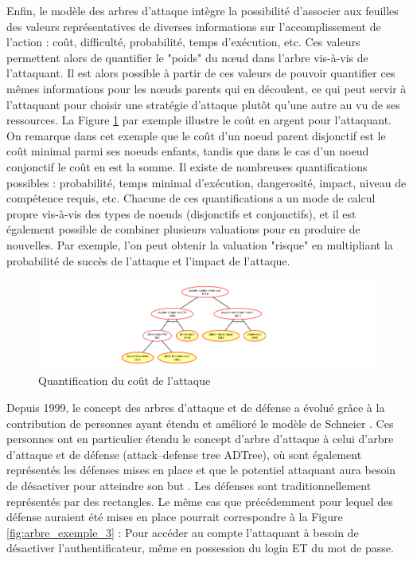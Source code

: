         Enfin, le modèle des arbres d'attaque intègre la possibilité d'associer aux feuilles des valeurs représentatives de diverses informations sur l'accomplissement de l'action : coût, difficulté, probabilité, temps d'exécution, etc. Ces valeurs permettent alors de quantifier le "poids" du nœud dans l'arbre vis-à-vis de l'attaquant. Il est alors possible à partir de ces valeurs de pouvoir quantifier ces mêmes informations pour les nœuds parents qui en découlent, ce qui peut servir à l'attaquant pour choisir une stratégie d'attaque plutôt qu'une autre au vu de ses ressources. La Figure \ref{fig:arbre_exemple_2} par exemple illustre le coût en argent pour l'attaquant. On remarque dans cet exemple que le coût d'un noeud parent disjonctif est le coût minimal parmi ses noeuds enfants, tandis que dans le cas d'un noeud conjonctif le coût en est la somme. Il existe de nombreuses quantifications possibles : probabilité, temps minimal d'exécution, dangerosité, impact, niveau de compétence requis, etc. Chacune de ces quantifications a un mode de calcul propre vis-à-vis des types de noeuds (disjonctifs et conjonctifs), et il est également possible de combiner plusieurs valuations pour en produire de nouvelles. Par exemple, l'on peut obtenir la valuation "risque" en multipliant la probabilité de succès de l'attaque et l'impact de l'attaque.

        \begin{figure}[htbp]
        \centering
        \includegraphics[width=\textwidth]{figure/quantification.pdf}%
        \caption{Quantification du coût de l'attaque}
        \label{fig:arbre_exemple_2}
        \end{figure}

		Depuis 1999, le concept des arbres d'attaque et de défense a évolué grâce à la contribution de personnes ayant étendu et amélioré le modèle de Schneier \cite{ADTreeKordy}. Ces personnes ont en particulier étendu le concept d'arbre d'attaque à celui d’arbre d’attaque et de défense (attack–defense tree ADTree), où sont également représentés les défenses mises en place et que le potentiel attaquant aura besoin de désactiver pour atteindre son but \cite{ADTreeOxford}. Les défenses sont traditionnellement représentés par des rectangles. Le même cas que précédemment pour lequel des défense auraient été mises en place pourrait correspondre à la Figure \ref{fig:arbre_exemple_3} : Pour accéder au compte l'attaquant à besoin de désactiver l'authentificateur, même en possession du login ET du mot de passe.

